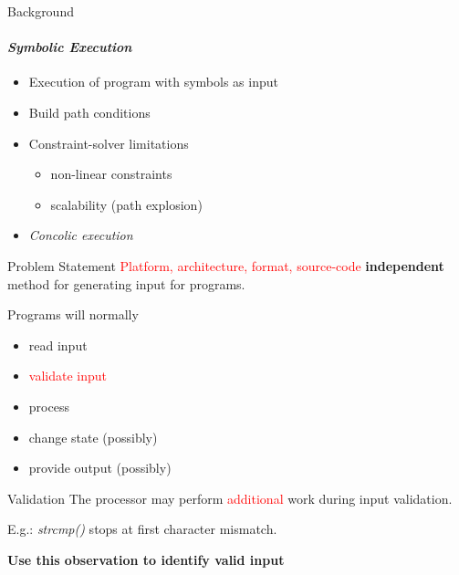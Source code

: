 \documentclass[pdf]{beamer}
\begin{document}
\begin{frame}{Background}
\framesubtitle{\textit{Symbolic Execution}}
\begin{itemize}
\item Execution of program with symbols as input
\item Build path conditions %
\item Constraint-solver limitations
	\begin{itemize}
	\item non-linear constraints
	\item scalability (path explosion)
	\end{itemize}
\item \textit{Concolic execution}
\end{itemize}
\end{frame}

\begin{frame}{Problem Statement}
\textcolor{red}{Platform, architecture, format, source-code} \textbf{independent} method for generating input for programs.
\end{frame}

\begin{frame}{}
Programs will normally
\begin{itemize}
\item read input
\pause
\item \textcolor{red}{validate input}
\pause
\item process
\pause
\item change state (possibly)
\pause
\item provide output (possibly)
\end{itemize}
\end{frame}

\begin{frame}{Validation}
The processor may perform \textcolor{red}{additional} work during input validation.

\vspace{\baselineskip}

E.g.: \textit{strcmp()} stops at first character mismatch.
\pause

\vspace{\baselineskip}

\textbf{Use this observation to identify valid input}

\end{frame}
\end{document}
